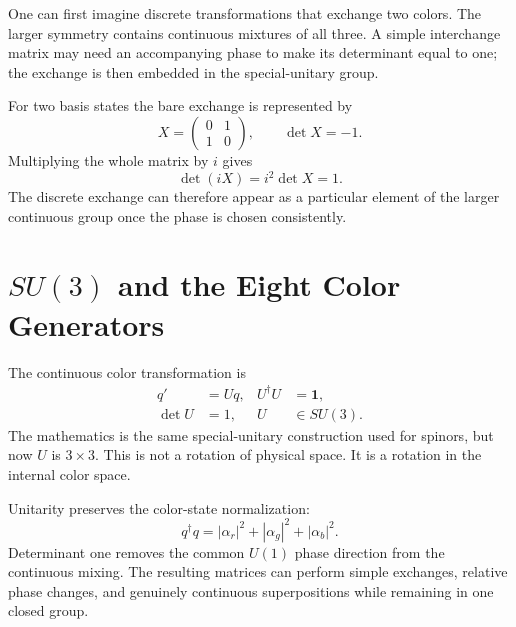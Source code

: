 One can first imagine discrete transformations that exchange two colors. The
larger symmetry contains continuous mixtures of all three. A simple
interchange matrix may need an accompanying phase to make its determinant
equal to one; the exchange is then embedded in the special-unitary group.

For two basis states the bare exchange is represented by
\begin{equation}
X=
\begin{pmatrix}0&1\\1&0\end{pmatrix},
\qquad
\det X=-1.
\end{equation}
Multiplying the whole matrix by \(i\) gives
\begin{equation}
\det(iX)=i^2\det X=1.
\end{equation}
The discrete exchange can therefore appear as a particular element of the
larger continuous group once the phase is chosen consistently.

\begin{classroomqa}
\end{classroomqa}

\section{\texorpdfstring{\(SU(3)\)}{SU(3)} and the Eight Color Generators}

The continuous color transformation is
\begin{equation}
\begin{aligned}
q'&=Uq,
&
U^\dagger U&=\boldsymbol 1,
\\
\det U&=1,
&
U&\in SU(3).
\end{aligned}
\label{eq:l3-su3-action}
\end{equation}
The mathematics is the same special-unitary construction used for spinors,
but now \(U\) is \(3\times3\). This is not a rotation of physical space. It is
a rotation in the internal color space.

Unitarity preserves the color-state normalization:
\begin{equation}
q^\dagger q
=|\alpha_r|^2+|\alpha_g|^2+|\alpha_b|^2.
\end{equation}
Determinant one removes the common \(U(1)\) phase direction from the continuous
mixing. The resulting matrices can perform simple exchanges, relative phase
changes, and genuinely continuous superpositions while remaining in one
closed group.


